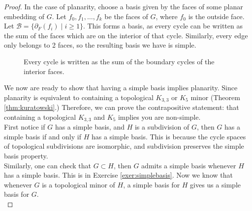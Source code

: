 \begin{proof}
 In the case of planarity, choose a basis given by the faces of some planar embedding of $G$. Let $f_0, f_1, \ldots, f_k$ be the faces of $G$, where $f_0$ is the outside face. Let $\mathcal B = \{\partial_F(f_i)\;|\; i\geq 1\}$. This forms a basis, as every cycle can be written as the sum of the faces which are on the interior of that cycle. Similarly, every edge only belongs to 2 faces, so the resulting basis we have is simple.  \\ 
 \begin{figure}
 \centering
\caption{Every cycle is written as the sum of the boundary cycles of the interior faces.}
\end{figure}
We now are ready to show that having a simple basis implies planarity. Since planarity is equivalent to containing a topological $K_{3,3}$ or $K_5$ minor (Theorem \ref{thm:kuratowski}.) Therefore, we can prove the contrapositive statement: that containing a topological $K_{3,3}$ and $K_5$ implies you are non-simple. \\
 First notice if $G$ has a simple basis, and $H$ is a subdivision of $G$, then $G$ has a simple basis if and only if $H$ has a simple basis. This is because the cycle spaces of topological subdivisions are isomorphic, and subdivision preserves the simple basis property. \\
 Similarly, one can check that $G\subset H$, then $G$ admits a simple basis whenever  $H$ has a simple basis. This is in Exercise \ref{exer:simplebasis}. Now we know that whenever $G$ is a topological minor of $H$, a simple basis for $H$ gives us a simple basis for $G$.  \\

\end{proof}
